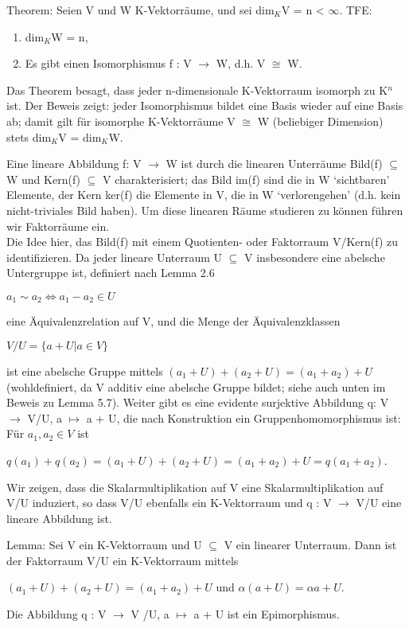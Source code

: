 Theorem: Seien V und W K-Vektorräume, und sei dim$_K$V = n < $\infty$. TFE:
\begin{enumerate}
\item dim$_K$W = n,
\item Es gibt einen Isomorphismus f : V $\to$ W, d.h. V $\cong$ W.
\end{enumerate}

\begin{remark}
Das Theorem besagt, dass jeder n-dimensionale K-Vektorraum isomorph zu K$^n$ ist. Der Beweis zeigt: jeder Isomorphismus bildet eine Basis wieder auf eine Basis ab; damit gilt für isomorphe K-Vektorräume V $\cong$ W (beliebiger Dimension) stets dim$_K$V = dim$_K$W.
\end{remark}

Eine lineare Abbildung f: V $\to$ W ist durch die linearen Unterräume Bild(f) $\subseteq$ W und Kern(f) $\subseteq$ V charakterisiert; das Bild im(f) sind die in W ‘sichtbaren’ Elemente, der Kern ker(f) die Elemente in V, die in W ‘verlorengehen’ (d.h. kein nicht-triviales Bild haben). Um diese linearen Räume studieren zu können führen wir Faktorräume ein.\\
Die Idee hier, das Bild(f) mit einem Quotienten- oder Faktorraum V/Kern(f) zu identifizieren. Da jeder lineare Unterraum U $\subseteq$ V insbesondere eine abelsche Untergruppe ist, definiert nach Lemma 2.6
\begin{center}
$a_1 \sim a_2 \Leftrightarrow a_1 - a_2 \in U$
\end{center}
eine Äquivalenzrelation auf V, und die Menge der Äquivalenzklassen
\begin{center}
$V /U = \{a + U | a \in V \}$
\end{center}
ist eine abelsche Gruppe mittels $(a_1 + U) + (a_2 + U) = (a_1 + a_2) + U$ (wohldefiniert, da V additiv eine abelsche Gruppe bildet; siehe auch unten im Beweis zu Lemma 5.7). Weiter gibt es eine evidente surjektive Abbildung q: V $\to$ V/U, a $\mapsto$ a + U, die nach Konstruktion ein Gruppenhomomorphismus ist: Für $a_1, a_2 \in V$ ist
\begin{center}
$q(a_1)+q(a_2)=(a_1 +U)+(a_2 +U)=(a_1 +a_2)+U =q(a_1 +a_2)$.
\end{center}
Wir zeigen, dass die Skalarmultiplikation auf V eine Skalarmultiplikation auf V/U induziert, so dass V/U ebenfalls ein K-Vektorraum und q : V $\to$ V/U eine lineare Abbildung ist.

Lemma: Sei V ein K-Vektorraum und U $\subseteq$ V ein linearer Unterraum. Dann ist der Faktorraum V/U ein K-Vektorraum mittels
\begin{center}
$(a_1 + U)+(a_2 + U)=(a_1 +a_2)+U$ und $\alpha(a+U)=\alpha a+U$.
\end{center} 
Die Abbildung q : V $\to$ V /U, a $\mapsto$ a + U ist ein Epimorphismus.

